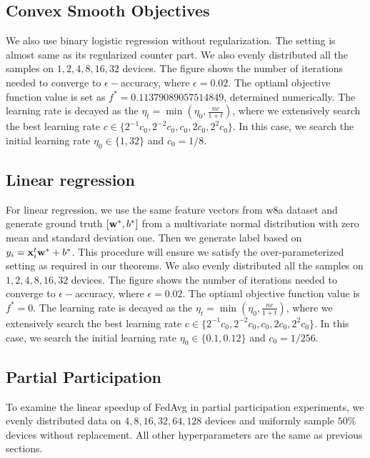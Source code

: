 \subsection{Convex Smooth Objectives}
We also use binary logistic regression without regularization.
The setting is almost same as its regularized counter part. We also evenly distributed all the samples on $1, 2, 4, 8, 16, 32$ devices. The figure shows the number of iterations needed to converge to $\epsilon-$accuracy, where $\epsilon=0.02$. The optiaml objective function value is set as $f^*=0.11379089057514849$, determined numerically. 
The learning rate is decayed as the $\eta_t = \min(\eta_0, \frac{nc}{1 + t})$, where we extensively search the best learning rate $c \in \{2^{-1}c_0, 2^{-2}c_0, c_0, 2c_0, 2^{2}c_0\}$. In this case, we search the initial learning rate $\eta_0\in \{1, 32\}$ and $c_0 = 1/8$.


\subsection{Linear regression}
For linear regression, we use the same feature vectors from w8a dataset 
and generate ground truth $[{\mathbf{w}}^*, b^*]$ from a multivariate normal distribution
with zero mean and standard deviation one. Then we generate label 
based on $y_i = {\mathbf{x}}_i^t{\mathbf{w}}^* + b^*$. This procedure will ensure we satisfy
the over-parameterized setting as required in our theorems. 
We also evenly distributed all the samples on $1, 2, 4, 8, 16, 32$ devices. The figure shows the number of iterations needed to converge to $\epsilon-$accuracy, where $\epsilon=0.02$. The optiaml objective function value is $f^*=0$. 
The learning rate is decayed as the $\eta_t = \min(\eta_0, \frac{nc}{1 + t})$, where we extensively search the best learning rate $c \in \{2^{-1}c_0, 2^{-2}c_0, c_0, 2c_0, 2^{2}c_0\}$. In this case, we search the initial learning rate $\eta_0\in \{0.1, 0.12\}$ and $c_0 = 1/256$.

\subsection{Partial Participation}
To examine the linear speedup of FedAvg in partial participation experiments,
we evenly distributed data on $4, 8, 16, 32, 64, 128$ devices and 
uniformly sample $50\%$ devices without replacement. All other hyperparameters
are the same as previous sections. 

